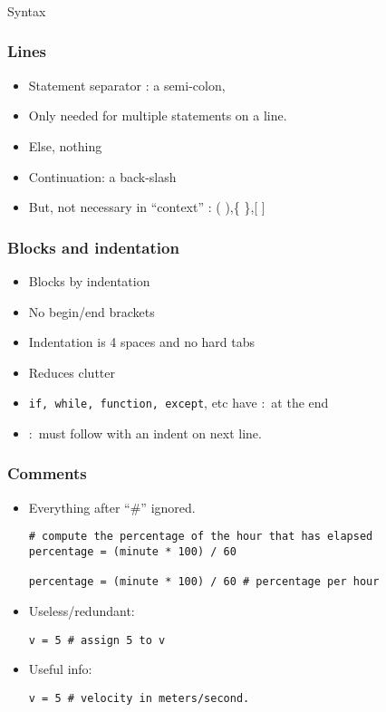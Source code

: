 \begin{frame}[fragile]\frametitle{}
\begin{center}
{\Large Syntax}
\end{center}
\end{frame}

\begin{frame}[fragile] \frametitle{Lines}
\begin{itemize}
\item  Statement separator : a semi-colon, 
\item Only needed for multiple statements on a line. 
\item Else, nothing
\item Continuation: a back-slash
\item  But, not necessary in ``context'' : ( ),\{ \},[ ]
\end{itemize}
\end{frame}

\begin{frame}[fragile] \frametitle{Blocks and indentation}
\begin{itemize}
\item  Blocks by indentation
\item No begin/end brackets
\item Indentation is 4 spaces and no hard tabs
\item Reduces clutter
\item \lstinline{if, while, function, except}, etc have $:$ at the end
\item $:$ must follow with an indent on next line.
\end{itemize}
\end{frame}


\begin{frame}[fragile] \frametitle{Comments}
\begin{itemize}
\item  Everything after ``\#'' ignored.
\begin{lstlisting}
# compute the percentage of the hour that has elapsed
percentage = (minute * 100) / 60

percentage = (minute * 100) / 60 # percentage per hour
\end{lstlisting}
\item Useless/redundant:
\begin{lstlisting}
v = 5 # assign 5 to v
\end{lstlisting}
\item Useful info:
\begin{lstlisting}
v = 5 # velocity in meters/second.
\end{lstlisting}
\end{itemize}
\end{frame}

